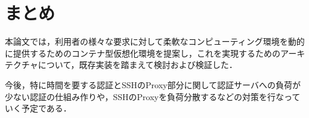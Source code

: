 \documentclass[dvipdfmx]{cs-handout}
\begin{document}
\section{まとめ}

本論文では，利用者の様々な要求に対して柔軟なコンピューティング環境を動的に提供するためのコンテナ型仮想化環境を提案し，これを実現するためのアーキテクチャについて，既存実装を踏まえて検討および検証した．

今後，特に時間を要する認証とSSHのProxy部分に関して認証サーバへの負荷が少ない認証の仕組み作りや，SSHのProxyを負荷分散するなどの対策を行なっていく予定である．

%


\end{document}
